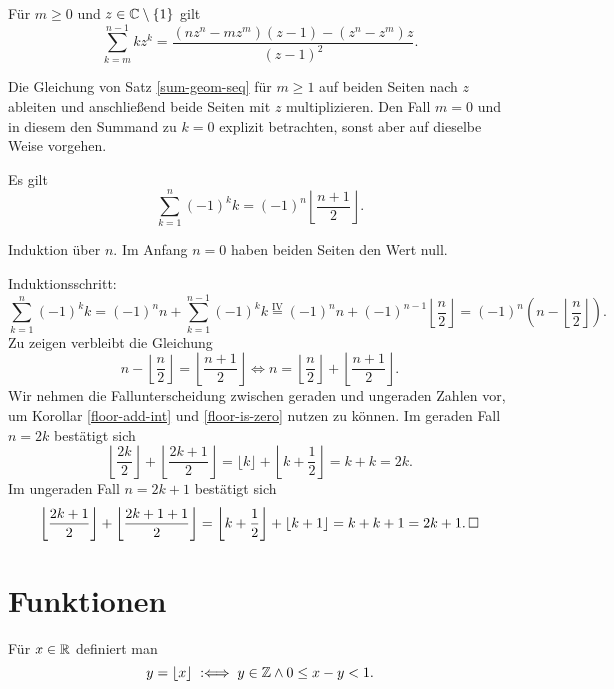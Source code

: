 \begin{Korollar}
Für $m\ge 0$ und $z\in\mathbb C\setminus\{1\}$ gilt
\[\sum_{k=m}^{n-1} kz^k
= \frac{(nz^n-mz^m)(z-1) - (z^n-z^m)z}{(z-1)^2}.\]
\end{Korollar}
\begin{Beweis}
Die Gleichung von Satz \ref{sum-geom-seq} für $m\ge 1$ auf beiden
Seiten nach $z$ ableiten und anschließend beide Seiten mit $z$
multiplizieren. Den Fall $m=0$ und in diesem den Summand zu $k=0$
explizit betrachten, sonst aber auf dieselbe Weise vorgehen.\,\qedsymbol
\end{Beweis}

\newpage
\begin{Satz} Es gilt
\[\sum_{k=1}^n (-1)^k k = (-1)^n\left\lfloor\frac{n+1}{2}\right\rfloor.\]
\end{Satz}
\begin{Beweis}
Induktion über $n$. Im Anfang $n=0$ haben beiden Seiten den Wert null.

Induktionsschritt:
\[\sum_{k=1}^n (-1)^k k = (-1)^n n + \sum_{k=1}^{n-1} (-1)^k k
\stackrel{\mathrm{IV}}= (-1)^n n + (-1)^{n-1}\left\lfloor\frac{n}{2}\right\rfloor
= (-1)^n (n-\left\lfloor\frac{n}{2}\right\rfloor).\]
Zu zeigen verbleibt die Gleichung
\[n-\left\lfloor\frac{n}{2}\right\rfloor = \left\lfloor\frac{n+1}{2}\right\rfloor
\iff n = \left\lfloor\frac{n}{2}\right\rfloor + 
\left\lfloor\frac{n+1}{2}\right\rfloor.\]
Wir nehmen die Fallunterscheidung zwischen geraden und ungeraden
Zahlen vor, um Korollar \ref{floor-add-int} und \ref{floor-is-zero}
nutzen zu können. Im geraden Fall $n=2k$ bestätigt sich
\[\left\lfloor\frac{2k}{2}\right\rfloor +  \left\lfloor\frac{2k+1}{2}\right\rfloor
= \lfloor k\rfloor + \left\lfloor k + \frac{1}{2}\right\rfloor = k + k = 2k.\]
Im ungeraden Fall $n=2k+1$ bestätigt sich
\[\left\lfloor\frac{2k+1}{2}\right\rfloor + \left\lfloor\frac{2k+1+1}{2}\right\rfloor
= \left\lfloor k + \frac{1}{2}\right\rfloor + \left\lfloor k+1\right\rfloor
= k + k + 1 = 2k + 1.\,\square\]
\end{Beweis}

\section{Funktionen}

\begin{Definition}[Floorfunktion]\label{def:floor}
Für $x\in\mathbb R$ definiert man
\[y = \lfloor x\rfloor\;:\Longleftrightarrow\; y\in\mathbb Z\land 0\le x-y < 1.\]
\end{Definition}

